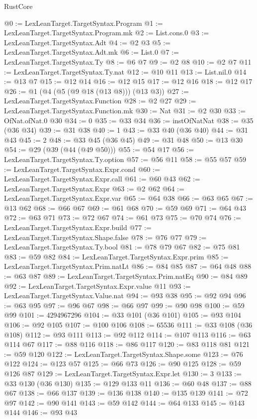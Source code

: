 \begin{lexlean}{RustCore}
\begin{coremodule}
@0 := LexLeanTarget.TargetSyntax.Program
@1 := LexLeanTarget.TargetSyntax.Program.mk
@2 := List.cons.{0}
@3 := LexLeanTarget.TargetSyntax.Adt
@4 := @2 @3
@5 := LexLeanTarget.TargetSyntax.Adt.mk
@6 := List.{0}
@7 := LexLeanTarget.TargetSyntax.Ty
@8 := @6 @7
@9 := @2 @8
@10 := @2 @7
@11 := LexLeanTarget.TargetSyntax.Ty.nat
@12 := @10 @11
@13 := List.nil.{0}
@14 := @13 @7
@15 := @12 @14
@16 := @12 @15
@17 := @12 @16
@18 := @12 @17
@26 := @1 (@4 (@5 (@9 @18 (@13 @8))) (@13 @3))
@27 := LexLeanTarget.TargetSyntax.Function
@28 := @2 @27
@29 := LexLeanTarget.TargetSyntax.Function.mk
@30 := Nat
@31 := @2 @30
@33 := OfNat.ofNat.{0} @30
@34 := 0
@35 := @33 @34
@36 := instOfNatNat
@38 := @35 (@36 @34)
@39 := @31 @38
@40 := 1
@43 := @33 @40 (@36 @40)
@44 := @31 @43
@45 := 2
@48 := @33 @45 (@36 @45)
@49 := @31 @48
@50 := @13 @30
@54 := @29 (@39 (@44 (@49 @50)))
@55 := @54 @17
@56 := LexLeanTarget.TargetSyntax.Ty.option
@57 := @56 @11
@58 := @55 @57
@59 := LexLeanTarget.TargetSyntax.Expr.cond
@60 := LexLeanTarget.TargetSyntax.Expr.call
@61 := @60 @43
@62 := LexLeanTarget.TargetSyntax.Expr
@63 := @2 @62
@64 := LexLeanTarget.TargetSyntax.Expr.var
@65 := @64 @38
@66 := @63 @65
@67 := @13 @62
@68 := @66 @67
@69 := @61 @68
@70 := @59 @69
@71 := @64 @43
@72 := @63 @71
@73 := @72 @67
@74 := @61 @73
@75 := @70 @74
@76 := LexLeanTarget.TargetSyntax.Expr.build
@77 := LexLeanTarget.TargetSyntax.Shape.false
@78 := @76 @77
@79 := LexLeanTarget.TargetSyntax.Ty.bool
@81 := @78 @79 @67
@82 := @75 @81
@83 := @59 @82
@84 := LexLeanTarget.TargetSyntax.Expr.prim
@85 := LexLeanTarget.TargetSyntax.Prim.natLt
@86 := @84 @85
@87 := @64 @48
@88 := @63 @87
@89 := LexLeanTarget.TargetSyntax.Prim.natEq
@90 := @84 @89
@92 := LexLeanTarget.TargetSyntax.Expr.value @11
@93 := LexLeanTarget.TargetSyntax.Value.nat
@94 := @93 @38
@95 := @92 @94
@96 := @63 @95
@97 := @96 @67
@98 := @66 @97
@99 := @90 @98
@100 := @59 @99
@101 := 4294967296
@104 := @33 @101 (@36 @101)
@105 := @93 @104
@106 := @92 @105
@107 := @100 @106
@108 := 65536
@111 := @33 @108 (@36 @108)
@112 := @93 @111
@113 := @92 @112
@114 := @107 @113
@116 := @63 @114 @67
@117 := @88 @116
@118 := @86 @117
@120 := @83 @118 @81
@121 := @59 @120
@122 := LexLeanTarget.TargetSyntax.Shape.some
@123 := @76 @122
@124 := @123 @57
@125 := @66 @73
@126 := @90 @125
@128 := @59 @126 @87
@129 := LexLeanTarget.TargetSyntax.Expr.let
@130 := 3
@133 := @33 @130 (@36 @130)
@135 := @129 @133 @11
@136 := @60 @48
@137 := @88 @67
@138 := @66 @137
@139 := @136 @138
@140 := @135 @139
@141 := @72 @97
@142 := @90 @141
@143 := @59 @142
@144 := @64 @133
@145 := @143 @144
@146 := @93 @43

\end{coremodule}
\end{lexlean}
